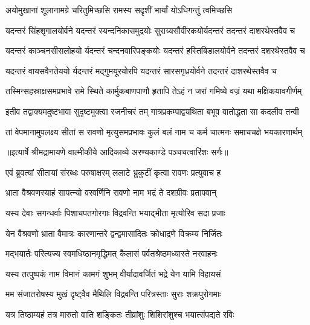 \twolineshloka
{अयोमुखानां शूलानामग्रे चरितुमिच्छसि}
{रामस्य सदृशीं भार्यां योऽधिगन्तुं त्वमिच्छसि} %

\fourlineindentedshloka
{यदन्तरं सिंहशृगालयोर्वने}
{ यदन्तरं स्यन्दनिकासमुद्रयोः}
{सुराग्र्यसौवीरकयोर्यदन्तरं}
{ तदन्तरं दाशरथेस्तवैव च} %

\fourlineindentedshloka
{यदन्तरं काञ्चनसीसलोहयो}
{र्यदन्तरं चन्दनवारिपङ्कयोः}
{यदन्तरं हस्तिबिडालयोर्वने}
{ तदन्तरं दशरथेस्तवैव च} %

\fourlineindentedshloka
{यदन्तरं वायसवैनतेययो}
{र्यदन्तरं मद्गुमयूरयोरपि}
{यदन्तरं सारसगृध्रयोर्वने}
{ तदन्तरं दाशरथेस्तवैव च} %

\fourlineindentedshloka
{तस्मिन्सहस्राक्षसमप्रभावे}
{ रामे स्थिते कार्मुकबाणपाणौ}
{हृतापि तेऽहं न जरां गमिष्ये}
{ वज्रं यथा मक्षिकयावगीर्णम्} %

\fourlineindentedshloka
{इतीव तद्वाक्यमदुष्टभावा}
{ सुदृष्टमुक्त्वा रजनीचरं तम्}
{गात्रप्रकम्पाद्व्यथिता बभूव}
{ वातोद्धता सा कदलीव तन्वी} %

\fourlineindentedshloka
{तां वेपमानामुपलक्ष्य सीतां}
{ स रावणो मृत्युसमप्रभावः}
{कुलं बलं नाम च कर्म चात्मनः}
{ समाचचक्षे भयकारणार्थम्} %


{॥इत्यार्षे श्रीमद्रामायणे वाल्मीकीये आदिकाव्ये अरण्यकाण्डे पञ्चचत्वारिंशः सर्गः॥}


\twolineshloka
{एवं ब्रुवत्यां सीतायां संरब्धः परुषाक्षरम्}
{ललाटे भ्रुकुटीं कृत्वा रावणः प्रत्युवाच ह} %

\twolineshloka
{भ्राता वैश्रवणस्याहं सापत्न्यो वरवर्णिनि}
{रावणो नाम भद्रं ते दशग्रीवः प्रतापवान्} %

\twolineshloka
{यस्य देवाः सगन्धर्वाः पिशाचपतगोरगाः}
{विद्रवन्ति भयाद्भीता मृत्योरिव सदा प्रजाः} %

\twolineshloka
{येन वैश्रवणो भ्राता वैमात्रः कारणान्तरे}
{द्वन्द्वमासादितः क्रोधाद्रणे विक्रम्य निर्जितः} %

\twolineshloka
{मद्भयार्तः परित्यज्य स्वमधिष्ठानमृद्धिमत्}
{कैलासं पर्वतश्रेष्ठमध्यास्ते नरवाहनः} %

\twolineshloka
{यस्य तत्पुष्पकं नाम विमानं कामगं शुभम्}
{वीर्यादावर्जितं भद्रे येन यामि विहायसं} %

\twolineshloka
{मम संजातरोषस्य मुखं दृष्ट्वैव मैथिलि}
{विद्रवन्ति परित्रस्ताः सुराः शक्रपुरोगमाः} %

\twolineshloka
{यत्र तिष्ठाम्यहं तत्र मारुतो वाति शङ्कितः}
{तीव्रांशुः शिशिरांशुश्च भयात्संपद्यते रविः} %

